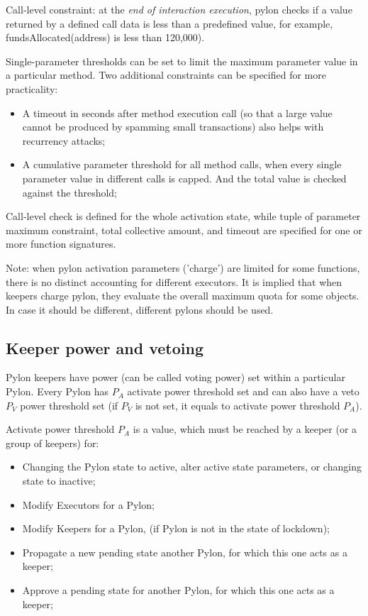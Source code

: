 \documentclass[12pt]{article}
\begin{document}
Call-level constraint: at the \emph{end of interaction execution}, pylon checks if a value returned by a defined call data is less than a predefined value, for example, fundsAllocated(address) is less than 120,000).

Single-parameter thresholds can be set to limit the maximum parameter value in a particular method. Two additional constraints can be specified for more practicality:
\begin{itemize}
\item{A timeout in seconds after method execution call (so that a large value cannot be produced by spamming small transactions) also helps with recurrency attacks;}
\item{A cumulative parameter threshold for all method calls, when every single parameter value in different calls is capped. And the total value is checked against the threshold;}
\end{itemize}

Call-level check is defined for the whole activation state, while tuple of parameter maximum constraint, total collective amount, and timeout are specified for one or more function signatures.

Note: when pylon activation parameters ('charge') are limited for some functions, there is no distinct accounting for different executors. It is implied that when keepers charge pylon, they evaluate the overall maximum quota for some objects. In case it should be different, different pylons should be used.


\subsection{Keeper power and vetoing}


Pylon keepers have power (can be called voting power) set within a particular Pylon.
Every Pylon has $P_A$ activate power threshold set and can also have a veto $P_V$ power threshold set (if $P_V$ is not set, it equals to activate power threshold $P_A$).

\medskip
Activate power threshold $P_A$ is a value, which must be reached by a keeper (or a group of keepers) for:
\begin{itemize}
\item{Changing the Pylon state to active, alter active state parameters, or changing state to inactive;}
\item{Modify Executors for a Pylon;}
\item{Modify Keepers for a Pylon, (if Pylon is not in the state of lockdown);}
\item{Propagate a new pending state another Pylon, for which this one acts as a keeper;}
\item{Approve a pending state for another Pylon, for which this one acts as a keeper;}
\end{itemize}
\end{document}
